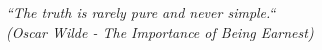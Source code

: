 \documentclass[
	12pt,				%
	openright,			%
	twoside,			%
	a4paper,			%
	english,			%
	french,				%
	spanish,			%
	brazil				%
	]{abntex2}
\begin{document}
\renewcommand{\listfigurename}{List of Figures}
\renewcommand{\listtablename}{List of Tables}
\renewcommand{\contentsname}{Summary}
\renewcommand{\listadesiglasname}{Abbreviations and acronyms}

\frenchspacing 


\imprimircapa

\imprimirfolhaderosto*


%
%     


\cleardoublepage

\begin{epigrafe}
    \vspace*{\fill}
	\begin{flushright}
		\textit{``The truth is rarely pure and never simple.`` \\
		(Oscar Wilde - The Importance of Being Earnest)}
	\end{flushright}
\end{epigrafe}

\end{document}
